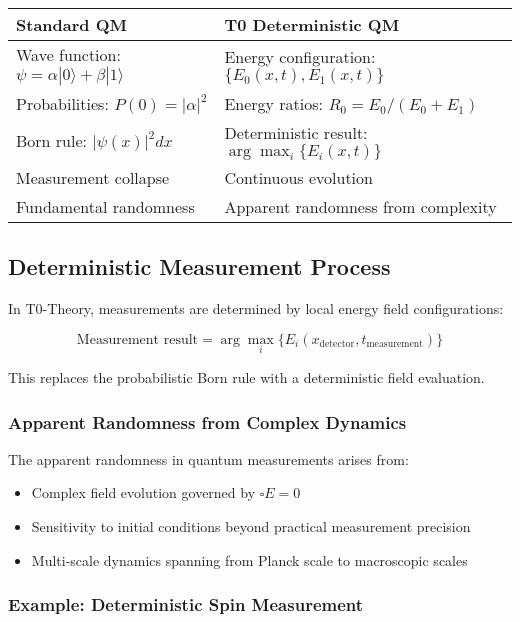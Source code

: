 \documentclass[12pt,a4paper]{article}
\theoremstyle{definition}
\begin{document}
\begin{center}
	\begin{tabular}{|p{7cm}|p{7cm}|}
		\hline
		\textbf{Standard QM} & \textbf{T0 Deterministic QM} \\
		\hline
		Wave function: $\psi = \alpha|0\rangle + \beta|1\rangle$ & Energy configuration: $\{E_0(x,t), E_1(x,t)\}$ \\
		\hline
		Probabilities: $P(0) = |\alpha|^2$ & Energy ratios: $R_0 = E_0/(E_0 + E_1)$ \\
		\hline
		Born rule: $|\psi(x)|^2 dx$ & Deterministic result: $\arg\max_i\{E_i(x,t)\}$ \\
		\hline
		Measurement collapse & Continuous evolution \\
		\hline
		Fundamental randomness & Apparent randomness from complexity \\
		\hline
	\end{tabular}
\end{center}

\subsection{Deterministic Measurement Process}

In T0-Theory, measurements are determined by local energy field configurations:

\begin{equation}
	\boxed{\text{Measurement result} = \arg\max_i\{E_i(x_{\text{detector}}, t_{\text{measurement}})\}}
\end{equation}

This replaces the probabilistic Born rule with a deterministic field evaluation.

\subsubsection{Apparent Randomness from Complex Dynamics}

The apparent randomness in quantum measurements arises from:
\begin{itemize}
	\item Complex field evolution governed by $\square E = 0$
	\item Sensitivity to initial conditions beyond practical measurement precision
	\item Multi-scale dynamics spanning from Planck scale to macroscopic scales
\end{itemize}

\subsubsection{Example: Deterministic Spin Measurement}
\end{document}
